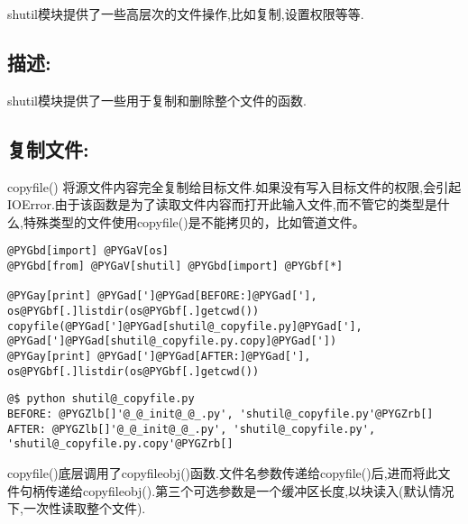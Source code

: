 \documentclass[letterpaper,10pt,english]{manual}
\begin{document}
shutil模块提供了一些高层次的文件操作,比如复制,设置权限等等.


\subsection{描述:}

shutil模块提供了一些用于复制和删除整个文件的函数.


\subsection{复制文件:}

copyfile() 将源文件内容完全复制给目标文件.如果没有写入目标文件的权限,会引起IOError.由于该函数是为了读取文件内容而打开此输入文件,而不管它的类型是什么,特殊类型的文件使用copyfile()是不能拷贝的，比如管道文件。

\begin{Verbatim}[commandchars=@\[\]]
@PYGbd[import] @PYGaV[os]
@PYGbd[from] @PYGaV[shutil] @PYGbd[import] @PYGbf[*]

@PYGay[print] @PYGad[']@PYGad[BEFORE:]@PYGad['], os@PYGbf[.]listdir(os@PYGbf[.]getcwd())
copyfile(@PYGad[']@PYGad[shutil@_copyfile.py]@PYGad['], @PYGad[']@PYGad[shutil@_copyfile.py.copy]@PYGad['])
@PYGay[print] @PYGad[']@PYGad[AFTER:]@PYGad['], os@PYGbf[.]listdir(os@PYGbf[.]getcwd())
\end{Verbatim}

\begin{Verbatim}[commandchars=@\[\]]
@$ python shutil@_copyfile.py
BEFORE: @PYGZlb[]'@_@_init@_@_.py', 'shutil@_copyfile.py'@PYGZrb[]
AFTER: @PYGZlb[]'@_@_init@_@_.py', 'shutil@_copyfile.py', 'shutil@_copyfile.py.copy'@PYGZrb[]
\end{Verbatim}

copyfile()底层调用了copyfileobj()函数.文件名参数传递给copyfile()后,进而将此文件句柄传递给copyfileobj().第三个可选参数是一个缓冲区长度,以块读入(默认情况下,一次性读取整个文件).
\end{document}
